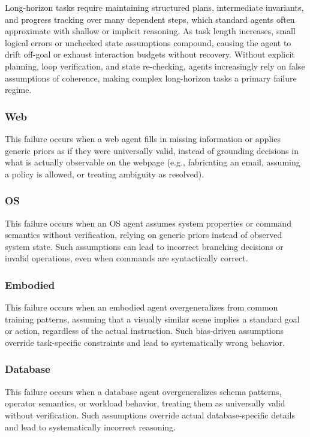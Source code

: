 \documentclass[11pt]{article}
\begin{document}
\begin{enumerate}
Long-horizon tasks require maintaining structured plans, intermediate invariants, and progress tracking over many dependent steps, which standard agents often approximate with shallow or implicit reasoning. As task length increases, small logical errors or unchecked state assumptions compound, causing the agent to drift off-goal or exhaust interaction budgets without recovery. Without explicit planning, loop verification, and state re-checking, agents increasingly rely on false assumptions of coherence, making complex long-horizon tasks a primary failure regime.

\end{enumerate}
\subsubsection{Web}
This failure occurs when a web agent fills in missing information or applies generic priors as if they were universally valid, instead of grounding decisions in what is actually observable on the webpage (e.g., fabricating an email, assuming a policy is allowed, or treating ambiguity as resolved).
\subsubsection{OS}
This failure occurs when an OS agent assumes system properties or command semantics without verification, relying on generic priors instead of observed system state. Such assumptions can lead to incorrect branching decisions or invalid operations, even when commands are syntactically correct.

\subsubsection{Embodied}
This failure occurs when an embodied agent overgeneralizes from common training patterns, assuming that a visually similar scene implies a standard goal or action, regardless of the actual instruction. Such bias-driven assumptions override task-specific constraints and lead to systematically wrong behavior.

\subsubsection{Database}
This failure occurs when a database agent overgeneralizes schema patterns, operator semantics, or workload behavior, treating them as universally valid without verification. Such assumptions override actual database-specific details and lead to systematically incorrect reasoning.
\end{document}

